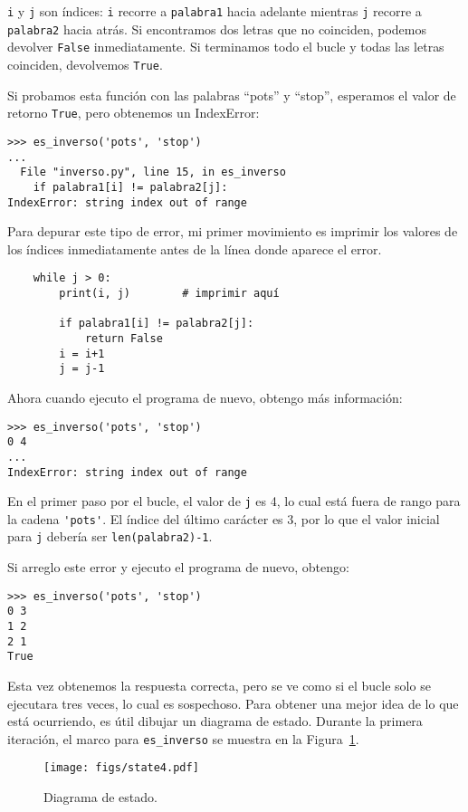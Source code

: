 \documentclass[10pt]{book}
\begin{document}
{\tt i} y {\tt j} son índices: {\tt i} recorre a {\tt palabra1}
hacia adelante mientras {\tt j} recorre a {\tt palabra2} hacia atrás.  Si encontramos
dos letras que no coinciden, podemos devolver {\tt False} inmediatamente.
Si terminamos todo el bucle y todas las letras coinciden,
devolvemos {\tt True}.

Si probamos esta función con las palabras ``pots'' y ``stop'',
esperamos el valor de retorno {\tt True}, pero obtenemos un IndexError:

\begin{verbatim}
>>> es_inverso('pots', 'stop')
...
  File "inverso.py", line 15, in es_inverso
    if palabra1[i] != palabra2[j]:
IndexError: string index out of range
\end{verbatim}
%
Para depurar este tipo de error, mi primer movimiento es
imprimir los valores de los índices inmediatamente antes de la línea
donde aparece el error.

\begin{verbatim}
    while j > 0:
        print(i, j)        # imprimir aquí

        if palabra1[i] != palabra2[j]:
            return False
        i = i+1
        j = j-1
\end{verbatim}
%
Ahora cuando ejecuto el programa de nuevo, obtengo más información:

\begin{verbatim}
>>> es_inverso('pots', 'stop')
0 4
...
IndexError: string index out of range
\end{verbatim}
%
En el primer paso por el bucle, el valor de {\tt j} es 4,
lo cual está fuera de rango para la cadena \verb"'pots'".
El índice del último carácter es 3, por lo que el
valor inicial para {\tt j} debería ser {\tt len(palabra2)-1}.

Si arreglo este error y ejecuto el programa de nuevo, obtengo:

\begin{verbatim}
>>> es_inverso('pots', 'stop')
0 3
1 2
2 1
True
\end{verbatim}
%
Esta vez obtenemos la respuesta correcta, pero se ve como si el bucle solo se ejecutara
tres veces, lo cual es sospechoso.  Para obtener una mejor idea de lo que está
ocurriendo, es útil dibujar un diagrama de estado.  Durante la primera
iteración, el marco para \verb"es_inverso" se muestra en la
Figura~\ref{fig.state4}.   

\begin{figure}
\centerline
{\texttt{[image: figs/state4.pdf]}}
\caption{Diagrama de estado.}
\label{fig.state4}
\end{figure}
\end{document}
